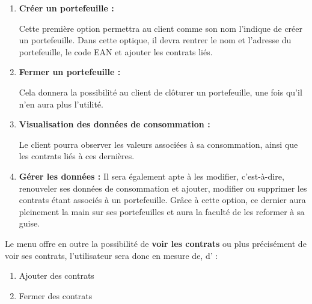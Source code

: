 \begin{enumerate}[-]
\item \textbf{Créer un portefeuille : }\newline

Cette première option permettra au client comme son nom l’indique de créer un portefeuille. \newline
Dans cette optique, il devra rentrer le nom et l’adresse du portefeuille, le code EAN et ajouter les contrats liés.

\item \textbf{Fermer un portefeuille :}\newline

Cela donnera la possibilité au client de clôturer un portefeuille, une fois qu’il n’en aura plus l’utilité.

\item \textbf{Visualisation des données de consommation :}\newline

Le client pourra observer les valeurs associées à sa consommation, ainsi que les contrats liés à ces dernières.

\item \textbf{Gérer les données :} \newline
Il sera également apte à les modifier, c’est-à-dire, renouveler ses données de consommation et ajouter, modifier ou supprimer les contrats étant associés à un portefeuille.\newline
Grâce à cette option, ce dernier aura pleinement la main sur ses portefeuilles et aura la faculté de les reformer à sa guise.
\end{enumerate}

\newpage

\begin{flushleft}
Le menu offre en outre la possibilité de \textbf{voir les contrats} ou plus précisément de voir ses contrats, l’utilisateur sera donc en mesure de, d’ :
\end{flushleft}
\begin{enumerate}[1.]
\item Ajouter des contrats
\item Fermer des contrats
\end{enumerate}

